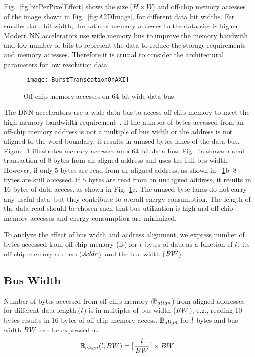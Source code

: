 Fig.~\ref{fig:bitPerPixelEffect} shows the size ($H\times{W}$) and off-chip memory accesses of the image shown in  Fig.~\ref{fig:A2DImage}, for different data bit widths. For smaller data bit width, the ratio of memory accesses to the data size is higher. Modern NN accelerators use wide memory bus to improve the memory bandwith and low number of bits to represent the data to reduce the storage requirements and memory accesses. Therefore it is crucial to consider the architectural parameters for low resolution data.
\begin{figure}[!htb]
	\centering
	\captionsetup{font=sf}	
	\texttt{[image: BurstTranscationOnAXI]}
	\caption{Off-chip memory accesses on 64-bit wide data bus}
	\label{fig:AXI_AccesseOn64BitDataBus}
\end{figure}

The DNN accelerators use a wide data bus to access off-chip memory to meet the high memory bandwidth requirement~\cite{Chen2016EyerissAS,chen2014diannao}. If the number of bytes accessed from an off-chip memory address is not a multiple of bus width or the address is not aligned to the word boundary, it results in unused bytes lanes of the data bus. Figure~\ref{fig:AXI_AccesseOn64BitDataBus} illustrates memory accesses on a 64-bit data bus.  Fig.~\ref{fig:AXI_AccesseOn64BitDataBus}a shows a read transaction of 8 bytes from an aligned address and uses the full bus width. However, if only 5 bytes are read from an aligned address, as shown in \figurename~\ref{fig:AXI_AccesseOn64BitDataBus}b, 8 bytes are still accessed. If 5 bytes are read from an unaligned address, it results in 16 bytes of data access, as shown in Fig.~\ref{fig:AXI_AccesseOn64BitDataBus}c. The unused byte lanes do not carry any useful data, but they contribute to overall energy consumption. The length of the data read should be chosen such that bus utilization is high and off-chip memory accesses and energy consumption are minimized.

To analyze the effect of bus width and address alignment, we express number of bytes accessed from off-chip memory ($\numBytesOffChip$) for $\dataLength$ bytes of data as a function of $\dataLength$, its off-chip memory address ($\addressSym$), and the bus width ($\busWidth$).
\subsection{Bus Width}
Number of bytes accessed from off-chip memory ($\numBytesOffChip_{align}$) from aligned addresses for different data length ($\dataLength$) is in multiples of bus width ($\busWidth$), e.g., reading 10 bytes results in 16 bytes of off-chip memory access.  $\numBytesOffChip_{align}$ for $\dataLength$ bytes and bus width $\busWidth$ can be expressed as
\begin{align*}\label{eq:accessOfLengthL}
	\begin{aligned}[b]
		\numBytesOffChip_{align}(\dataLength,\busWidth) = \ceil[\big]{\frac{\dataLength}{\busWidth}}\times {\busWidth}
	\end{aligned}
\end{align*}
